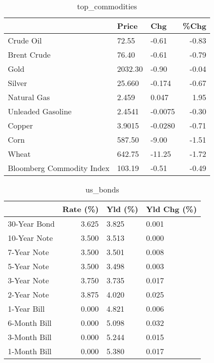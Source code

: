 \documentclass{article}%
\begin{document}
\begin{table}[htbp]%
\caption{top\_commodities}%
\centering%
\begin{adjustbox}{width=1\textwidth}%
\begin{tabular}{lllr}
\toprule
                          &   Price &     Chg &  \%Chg \\
\midrule
               Crude Oil  &   72.55 &   -0.61 & -0.83 \\
             Brent Crude  &   76.40 &   -0.61 & -0.79 \\
                    Gold  & 2032.30 &   -0.90 & -0.04 \\
                  Silver  &  25.660 &  -0.174 & -0.67 \\
             Natural Gas  &   2.459 &   0.047 &  1.95 \\
       Unleaded Gasoline  &  2.4541 & -0.0075 & -0.30 \\
                  Copper  &  3.9015 & -0.0280 & -0.71 \\
                    Corn  &  587.50 &   -9.00 & -1.51 \\
                   Wheat  &  642.75 &  -11.25 & -1.72 \\
Bloomberg Commodity Index &  103.19 &   -0.51 & -0.49 \\
\bottomrule
\end{tabular}
%
\end{adjustbox}%
\end{table}

%


\begin{table}[htbp]%
\caption{us\_bonds}%
\centering%
\begin{adjustbox}{width=1\textwidth}%
\begin{tabular}{lrll}
\toprule
             &  Rate (\%) & Yld (\%) & Yld Chg (\%) \\
\midrule
30-Year Bond &     3.625 &   3.825 &       0.001 \\
10-Year Note &     3.500 &   3.513 &       0.000 \\
 7-Year Note &     3.500 &   3.501 &       0.008 \\
 5-Year Note &     3.500 &   3.498 &       0.003 \\
 3-Year Note &     3.750 &   3.735 &       0.017 \\
 2-Year Note &     3.875 &   4.020 &       0.025 \\
 1-Year Bill &     0.000 &   4.821 &       0.006 \\
6-Month Bill &     0.000 &   5.098 &       0.032 \\
3-Month Bill &     0.000 &   5.244 &       0.015 \\
1-Month Bill &     0.000 &   5.380 &       0.017 \\
\bottomrule
\end{tabular}
%
\end{adjustbox}%
\end{table}
\end{document}
